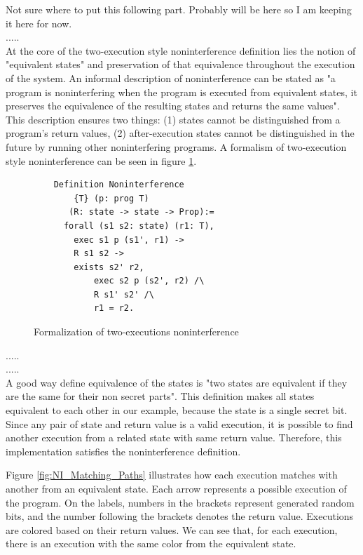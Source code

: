 \iffalse
{\red Not sure where to put this following part. Probably will be here so I am keeping it here for now.}\\
{\red .....}\\
At the core of the two-execution style noninterference definition lies the notion of "equivalent states" and preservation of that equivalence throughout the execution of the system. An informal description of noninterference can be stated as "a program is noninterfering when the program is executed from equivalent states, it preserves the equivalence of the resulting states and returns the same values". This description ensures two things: (1) states cannot be distinguished from a program's return values, (2) after-execution states cannot be distinguished in the future by running other noninterfering programs. A formalism of two-execution style noninterference can be seen in figure \ref{fig:NI_Definition}.

\begin{figure}[H]
    \centering
    \begin{verbatim}
    Definition Noninterference
        {T} (p: prog T) 
       (R: state -> state -> Prop):=
      forall (s1 s2: state) (r1: T),
        exec s1 p (s1', r1) ->
        R s1 s2 ->
        exists s2' r2,
            exec s2 p (s2', r2) /\
            R s1' s2' /\
            r1 = r2.
    \end{verbatim}
    \caption{Formalization of two-executions noninterference}
    \label{fig:NI_Definition}
\end{figure}
{\red .....}\\

{\red .....}\\
A good way define equivalence of the states is "two states are equivalent if they are the same for their non secret parts". This definition makes all states equivalent to each other in our example, because the state is a single secret bit. Since any pair of state and return value is a valid execution, it is possible to find another execution from a related state with same return value. Therefore, this implementation satisfies the noninterference definition. 

Figure \ref{fig:NI_Matching_Paths} illustrates how each execution matches with another from an equivalent state. Each arrow represents a possible execution of the program. On the labels, numbers in the brackets represent generated random bits, and the number following the brackets denotes the return value. Executions are colored based on their return values.
We can see that, for each execution, there is an execution with the same color  from the equivalent state.

